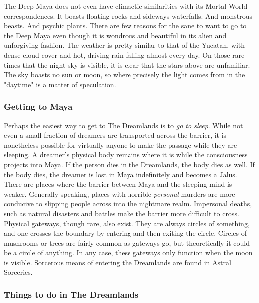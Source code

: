The Deep Maya does not even have climactic similarities with its Mortal World correspondences. It boasts floating rocks and sideways waterfalls. And monstrous beasts. And psychic plants. There are few reasons for the sane to want to go to the Deep Maya even though it is wondrous and beautiful in its alien and unforgiving fashion. The weather is pretty similar to that of the Yucatan, with dense cloud cover and hot, driving rain falling almost every day. On those rare times that the night sky is visible, it is clear that the stars above are unfamiliar. The sky boasts no sun or moon, so where precisely the light comes from in the "daytime" is a matter of speculation.

\subsubsection{Getting to Maya}

Perhaps the easiest way to get to The Dreamlands is to \textit{go to sleep}. While not even a small fraction of dreamers are transported across the barrier, it is nonetheless possible for virtually anyone to make the passage while they are sleeping. A dreamer's physical body remains where it is while the consciousness projects into Maya. If the person dies in the Dreamlands, the body dies as well. If the body dies, the dreamer is lost in Maya indefinitely and becomes a Jalus. There are places where the barrier between Maya and the sleeping mind is weaker. Generally speaking, places with horrible \textit{personal} murders are more conducive to slipping people across into the nightmare realm. Impersonal deaths, such as natural disasters and battles make the barrier more difficult to cross. Physical gateways, though rare, also exist. They are always circles of something, and one crosses the boundary by entering and then exiting the circle. Circles of mushrooms or trees are fairly common as gateways go, but theoretically it could be a circle of anything. In any case, these gateways only function when the moon is visible. Sorcerous means of entering the Dreamlands are found in Astral Sorceries.

\subsubsection{Things to do in The Dreamlands}

